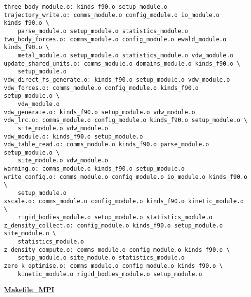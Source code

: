 \begin{verbatim}
three_body_module.o: kinds_f90.o setup_module.o
trajectory_write.o: comms_module.o config_module.o io_module.o kinds_f90.o \
	parse_module.o setup_module.o statistics_module.o
two_body_forces.o: comms_module.o config_module.o ewald_module.o kinds_f90.o \
	metal_module.o setup_module.o statistics_module.o vdw_module.o
update_shared_units.o: comms_module.o domains_module.o kinds_f90.o \
	setup_module.o
vdw_direct_fs_generate.o: kinds_f90.o setup_module.o vdw_module.o
vdw_forces.o: comms_module.o config_module.o kinds_f90.o setup_module.o \
	vdw_module.o
vdw_generate.o: kinds_f90.o setup_module.o vdw_module.o
vdw_lrc.o: comms_module.o config_module.o kinds_f90.o setup_module.o \
	site_module.o vdw_module.o
vdw_module.o: kinds_f90.o setup_module.o
vdw_table_read.o: comms_module.o kinds_f90.o parse_module.o setup_module.o \
	site_module.o vdw_module.o
warning.o: comms_module.o kinds_f90.o setup_module.o
write_config.o: comms_module.o config_module.o io_module.o kinds_f90.o \
	setup_module.o
xscale.o: comms_module.o config_module.o kinds_f90.o kinetic_module.o \
	rigid_bodies_module.o setup_module.o statistics_module.o
z_density_collect.o: config_module.o kinds_f90.o setup_module.o site_module.o \
	statistics_module.o
z_density_compute.o: comms_module.o config_module.o kinds_f90.o \
	setup_module.o site_module.o statistics_module.o
zero_k_optimise.o: comms_module.o config_module.o kinds_f90.o \
	kinetic_module.o rigid_bodies_module.o setup_module.o
\end{verbatim}
\clearpage
{\sc \bf \underline{Makefile\_MPI}}
